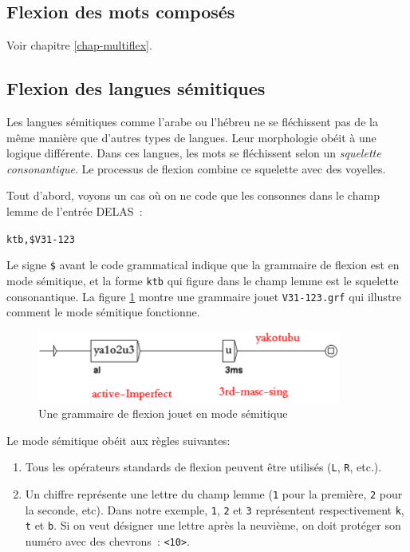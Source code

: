 \subsection{Flexion des mots composés}
Voir chapitre \ref{chap-multiflex}.

\subsection{Flexion des langues sémitiques}
\label{subsection-semitic-inflection}
Les langues  sémitiques comme l'arabe ou l'hébreu ne se fléchissent pas de la même manière 
que d'autres types de langues. Leur morphologie obéit à une logique différente.
Dans ces langues, les mots se fléchissent selon un \textit{squelette consonantique}. Le processus de
flexion combine ce squelette avec des voyelles.

\bigskip
\noindent Tout d'abord, voyons un cas où on ne code que les consonnes dans le champ lemme de l'entrée DELAS~:

\bigskip
\noindent \verb+ktb,$V31-123+

\bigskip
\noindent Le signe \verb+$+ avant le code grammatical indique que la grammaire de flexion est en mode sémitique, et
la forme \verb+ktb+ qui figure dans le champ lemme est le squelette consonantique. La figure \ref{semitic-grammar}
montre une grammaire jouet \verb+V31-123.grf+ qui illustre comment le mode sémitique fonctionne.

\bigskip
\begin{figure}[!ht]
\begin{center}
\includegraphics[width=10cm]{resources/img/fig3-15.png}
\caption{Une grammaire de flexion jouet en mode sémitique\label{semitic-grammar}}
\end{center}
\end{figure}

\bigskip
\noindent Le mode sémitique obéit aux règles suivantes:
\begin{enumerate}
\item Tous les opérateurs standards de flexion peuvent être utilisés (\verb+L+, \verb+R+, etc.).
\item Un chiffre représente une lettre du champ lemme (\verb+1+ pour la première,
\verb+2+ pour la seconde, etc). Dans notre exemple, \verb+1+, \verb+2+ et \verb+3+ représentent
respectivement \verb+k+, \verb+t+ et \verb+b+. Si on veut désigner une lettre après la neuvième,
on doit protéger son numéro avec des chevrons~: \verb+<10>+.
\end{enumerate}  


